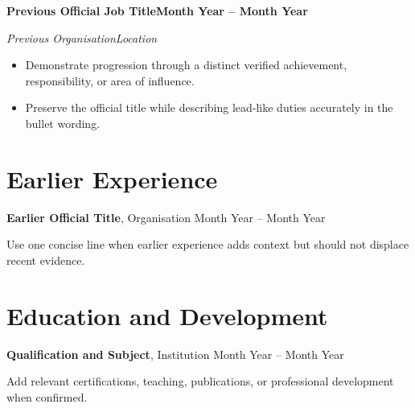 \documentclass[10pt,a4paper]{article}
\newcommand{\role}[4]{%
  {\large\bfseries #1}\hfill\textbf{#2}\par
  \textit{#3}\hfill\textit{#4}\par\vspace{-2pt}
}
\begin{document}
\role{Previous Official Job Title}{Month Year -- Month Year}{Previous Organisation}{Location}
\begin{itemize}
  \item Demonstrate progression through a distinct verified achievement, responsibility, or area of influence.
  \item Preserve the official title while describing lead-like duties accurately in the bullet wording.
\end{itemize}

\section{Earlier Experience}
\textbf{Earlier Official Title}, Organisation \hfill Month Year -- Month Year\par
Use one concise line when earlier experience adds context but should not displace recent evidence.

\section{Education and Development}
\textbf{Qualification and Subject}, Institution \hfill Month Year -- Month Year\par
Add relevant certifications, teaching, publications, or professional development when confirmed.
\end{document}

